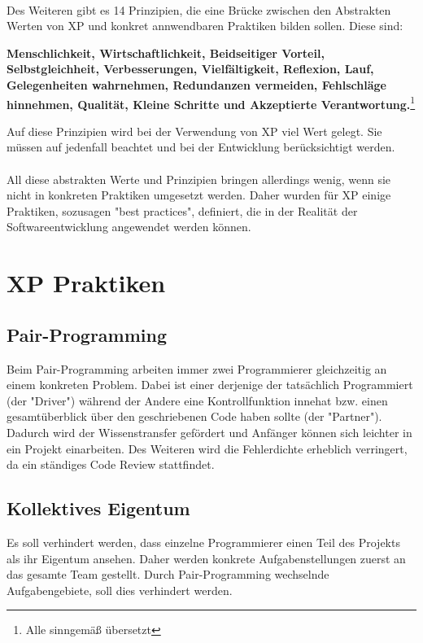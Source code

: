 \documentclass[a4paper, twopage]{scrreprt}
\begin{document}
\paragraph*{}
Des Weiteren gibt es 14 Prinzipien, die eine Brücke zwischen den Abstrakten Werten von XP und konkret annwendbaren Praktiken bilden sollen. Diese sind: 
\begin{center}
\textbf{Menschlichkeit, Wirtschaftlichkeit, Beidseitiger Vorteil, Selbstgleichheit, Verbesserungen, Vielfältigkeit, Reflexion, Lauf, Gelegenheiten wahrnehmen, Redundanzen vermeiden, Fehlschläge hinnehmen, Qualität, Kleine Schritte und Akzeptierte Verantwortung.}\footnote{Alle sinngemäß übersetzt}
\end{center}
Auf diese Prinzipien wird bei der Verwendung von XP viel Wert gelegt. Sie müssen auf jedenfall beachtet und bei der Entwicklung berücksichtigt werden.
\paragraph*{}
All diese abstrakten Werte und Prinzipien bringen allerdings wenig, wenn sie nicht in konkreten Praktiken umgesetzt werden. Daher wurden für XP einige Praktiken, sozusagen "best practices", definiert, die in der Realität der Softwareentwicklung angewendet werden können.
\section{XP Praktiken}
\label{sec:xp_praktiken}

\subsection{Pair-Programming}
\label{subsec:pairprogramming}
Beim Pair-Programming arbeiten immer zwei Programmierer gleichzeitig an einem konkreten Problem. Dabei ist einer derjenige der tatsächlich Programmiert (der "Driver") während der Andere eine Kontrollfunktion innehat bzw. einen gesamtüberblick über den geschriebenen Code haben sollte (der "Partner"). Dadurch wird der Wissenstransfer gefördert und Anfänger können sich leichter in ein Projekt einarbeiten. Des Weiteren wird die Fehlerdichte erheblich verringert, da ein ständiges Code Review stattfindet.
\subsection{Kollektives Eigentum}
Es soll verhindert werden, dass einzelne Programmierer einen Teil des Projekts als ihr Eigentum ansehen. Daher werden konkrete Aufgabenstellungen zuerst an das gesamte Team gestellt. Durch Pair-Programming wechselnde Aufgabengebiete, soll dies verhindert werden.
\end{document}
